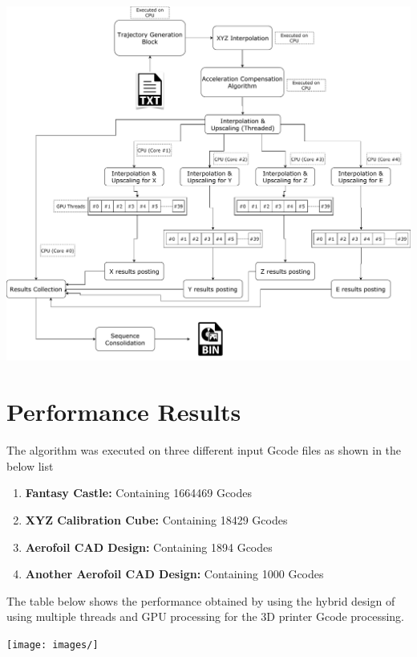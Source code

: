 \documentclass[12pt,letterpaper]{article}
\begin{document}
\begin{center}
   \includegraphics[scale=0.45]{images/parallel-program.pdf}
   \label{fig:parallel_algorithm}
\end{center}

\section{Performance Results}
The algorithm was executed on three different input Gcode files as shown in the below list
\begin{enumerate}
    \item \textbf{Fantasy Castle:} Containing 1664469 Gcodes
    \item \textbf{XYZ Calibration Cube:} Containing 18429 Gcodes
    \item \textbf{Aerofoil CAD Design:} Containing 1894 Gcodes
    \item \textbf{Another Aerofoil CAD Design:} Containing 1000 Gcodes
\end{enumerate}

The table below shows the performance obtained by using the hybrid design of using multiple threads and GPU processing for the 3D printer Gcode processing.

\begin{center}
   \texttt{[image: images/]}
   \label{fig:parallel_algorithm}
\end{center}
\end{document}
